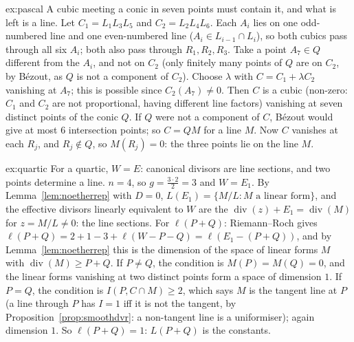 \begin{solution}{ex:pascal}
\idea A cubic meeting a conic in seven points must contain it, and what is left is a line.
\writeup Let $C_1=L_1L_3L_5$ and $C_2=L_2L_4L_6$. Each $A_i$ lies on one odd-numbered line and one even-numbered line ($A_i\in L_{i-1}\cap L_i$), so both cubics
pass through all six $A_i$; both also pass through $R_1,R_2,R_3$. Take a point $A_7\in Q$ different from the $A_i$, and not on $C_2$ (only finitely many
points of $Q$ are on $C_2$, by B\'ezout, as $Q$ is not a component of $C_2$). Choose $\lambda$ with $C=C_1+\lambda C_2$ vanishing at $A_7$; this is possible
since $C_2(A_7)\ne0$. Then $C$ is a cubic (non-zero: $C_1$ and $C_2$ are not proportional, having different line factors) vanishing at seven distinct points of
the conic $Q$. If $Q$ were not a component of $C$, B\'ezout would give at most $6$ intersection points; so $C=QM$ for a line $M$. Now $C$ vanishes at each $R_j$,
and $R_j\notin Q$, so $M(R_j)=0$: the three points lie on the line $M$.
\end{solution}

\begin{solution}{ex:quartic}
\idea For a quartic, $W=E$: canonical divisors are line sections, and two points determine a line.
\writeup $n=4$, so $g=\frac{3\cdot2}2=3$ and $W=E_1$. By Lemma~\ref{lem:noetherrep} with $D=0$, $L(E_1)=\{M/L:M\text{ a linear form}\}$, and the effective
divisors linearly equivalent to $W$ are the $\operatorname{div}(z)+E_1=\operatorname{div}(M)$ for $z=M/L\ne0$: the line sections. For $\ell(P+Q)$: Riemann--Roch gives
$\ell(P+Q)=2+1-3+\ell(W-P-Q)=\ell(E_1-(P+Q))$, and by Lemma~\ref{lem:noetherrep} this is the dimension of the space of linear forms $M$ with
$\operatorname{div}(M)\ge P+Q$. If $P\ne Q$, the condition is $M(P)=M(Q)=0$, and the linear forms vanishing at two distinct points form a space of dimension $1$.
If $P=Q$, the condition is $I(P,C\cap M)\ge2$, which says $M$ is the tangent line at $P$ (a line through $P$ has $I=1$ iff it is not the tangent, by
Proposition~\ref{prop:smoothdvr}: a non-tangent line is a uniformiser); again dimension $1$. So $\ell(P+Q)=1$: $L(P+Q)$ is the constants.
\end{solution}

